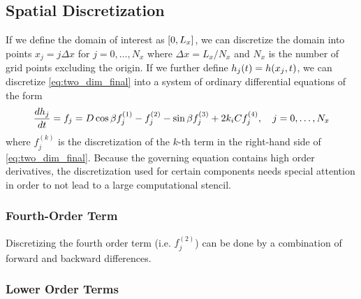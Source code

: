 \subsection{Spatial Discretization}
If we define the domain of interest as $\left[ 0, L_x \right]$, we can discretize the 
domain into points $x_j = j\Delta x$ for $j = 0, \ldots, N_x$ where 
$\Delta x = L_x / N_x$ and $N_x$ is the number of grid points excluding the origin. 
If we further define $h_j\!\left( t \right) = h\!\left( x_j, t \right)$, we can discretize 
\cref{eq:two_dim_final} into a system of ordinary differential equations of the form 
\begin{equation}
    \frac{d h_j}{d t} = f_j = D\cos \beta f_j^{(1)} - f_j^{(2)} - \sin \beta f_j^{(3)} + 2k_iC f_j^{(4)}, \quad j = 0, \ldots, N_x
    \label{eq:ode_sys}
\end{equation}
where $f_j^{(k)}$ is the discretization of the $k$-th term in
the right-hand side of \cref{eq:two_dim_final}. Because the governing equation 
contains high order derivatives, the discretization used for certain components 
needs special attention in order to not lead to a large computational stencil.

\subsubsection{Fourth-Order Term}
Discretizing the fourth order term (i.e. $f_j^{(2)}$) can be done by a combination
of forward and backward differences. 

\subsubsection{Lower Order Terms}
